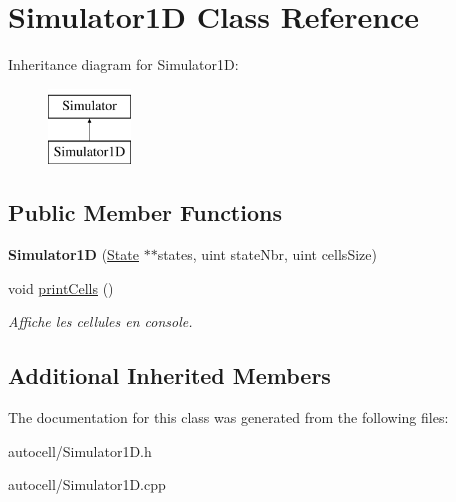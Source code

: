 \hypertarget{class_simulator1_d}{}\section{Simulator1D Class Reference}
\label{class_simulator1_d}
Inheritance diagram for Simulator1D\+:\begin{figure}[H]
\begin{center}
\leavevmode
\includegraphics[height=2.000000cm]{class_simulator1_d}
\end{center}
\end{figure}
\subsection*{Public Member Functions}
\begin{DoxyCompactItemize}
\item 
\mbox{\label{class_simulator1_d_ad6e5e24d1cf2a8b75093e5fc1b6e5060}} 
{\bfseries Simulator1D} (\mbox{\hyperlink{class_state}{State}} $\ast$$\ast$states, uint state\+Nbr, uint cells\+Size)
\item 
\mbox{\label{class_simulator1_d_a3f5ece6b16bca82a1952466da7024686}} 
void \mbox{\hyperlink{class_simulator1_d_a3f5ece6b16bca82a1952466da7024686}{print\+Cells}} ()
\begin{DoxyCompactList}\small\item\em Affiche les cellules en console. \end{DoxyCompactList}\end{DoxyCompactItemize}
\subsection*{Additional Inherited Members}


The documentation for this class was generated from the following files\+:\begin{DoxyCompactItemize}
\item 
autocell/Simulator1\+D.\+h\item 
autocell/Simulator1\+D.\+cpp\end{DoxyCompactItemize}
